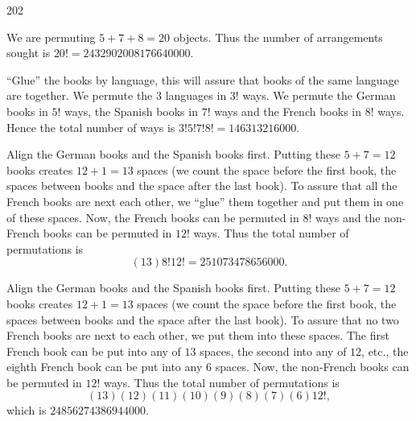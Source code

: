 \documentclass[11pt, openany]{book}
\theoremstyle{change} \theoremheaderfont{\blue\sffamily\bfseries}
\theoremstyle{nonumberplain} \theoremheaderfont{\sffamily\bfseries}
\newcommand{\í}{\'{\i}}
\begin{document}
\begin{multicols}{2}\columnseprule 1pt \columnsep 25pt
\begin{dingautolist}{202} \item We are permuting $5 + 7 + 8 = 20$ objects. Thus the number
of arrangements sought is $20! = 2432902008176640000$. \item
``Glue'' the books by language, this will assure that books of the
same language are together. We permute the $3$ languages in $3!$
ways. We permute the German books in $5!$ ways, the Spanish books in
$7!$ ways and the French books in $8!$ ways. Hence the total number
of ways is $3!5!7!8! = 146313216000$. \item Align the German books
and the Spanish books first. Putting these $5 + 7 = 12$ books
creates $12 + 1 = 13$ spaces (we count the space before the first
book, the spaces between books and the space after the last book).
To assure that all the French books are next each other, we ``glue''
them together and put them in one of these spaces.  Now, the French
books can be permuted in $8!$ ways and the non-French books can be
permuted in $12!$ ways. Thus the total number of permutations is
$$ (13)8!12! =  251073478656000.$$
\item Align the German books and the Spanish books first. Putting
these $5 + 7 = 12$ books creates $12 + 1 = 13$ spaces (we count the
space before the first book, the spaces between books and the space
after the last book). To assure that no two French books are next to
each other, we put them into these spaces. The first French book can
be put into any of $13$ spaces, the second into any of $12$, etc.,
the eighth French book can be put into any $6$ spaces. Now, the
non-French books can be permuted in  $12!$ ways. Thus the total
number of permutations is
$$ (13)(12)(11)(10)(9)(8)(7)(6)12!,$$which is $24856274386944000.$
\end{dingautolist}
\end{multicols}
\end{document}
